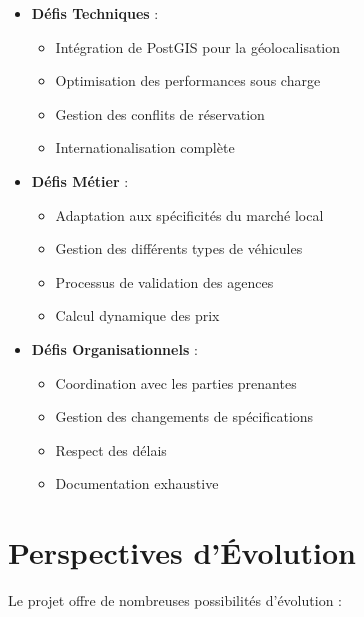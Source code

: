 \begin{itemize}
    \item \textbf{Défis Techniques} :
    \begin{itemize}
        \item Intégration de PostGIS pour la géolocalisation
        \item Optimisation des performances sous charge
        \item Gestion des conflits de réservation
        \item Internationalisation complète
    \end{itemize}
    
    \item \textbf{Défis Métier} :
    \begin{itemize}
        \item Adaptation aux spécificités du marché local
        \item Gestion des différents types de véhicules
        \item Processus de validation des agences
        \item Calcul dynamique des prix
    \end{itemize}
    
    \item \textbf{Défis Organisationnels} :
    \begin{itemize}
        \item Coordination avec les parties prenantes
        \item Gestion des changements de spécifications
        \item Respect des délais
        \item Documentation exhaustive
    \end{itemize}
\end{itemize}

\section{Perspectives d'Évolution}
Le projet offre de nombreuses possibilités d'évolution :

